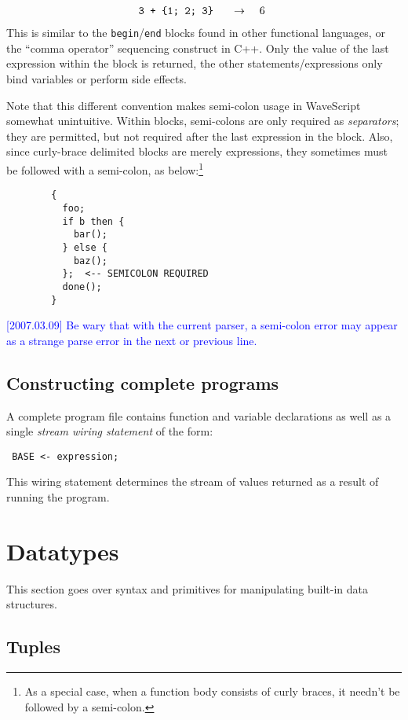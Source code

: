\documentclass[twocolumn]{report}
\newcommand{\rednote}[1]{{\textcolor{blue}{#1}}}
\newcommand{\evalsto}[2]{\[ \begin{array}{rcl}
$\tt #1 $&$ \arr $&$ #2 $
\end{array} \]}
\newcommand{\arr}{\ensuremath{\rightarrow}}
\newenvironment{wscode}{\begin{center}\tt}{\end{center}}
\begin{document}
\evalsto{3 + \{1; 2; 3\}} {6}
%
This is similar to the {\tt begin}/{\tt end} blocks found in other
functional languages, or the ``comma operator'' sequencing construct
in C++.  Only the value of the last expression within the block is
returned, the other statements/expressions only bind variables or
perform side effects.

Note that this different convention makes semi-colon usage in
WaveScript somewhat unintuitive.  Within blocks, semi-colons are only
required as {\em separators}; they are permitted, but not required
after the last expression in the block.  Also, since curly-brace
delimited blocks are merely expressions, they sometimes must be
followed with a semi-colon, as below:\footnote{As a special case, when
a function body consists of curly braces, it needn't be followed by a semi-colon.}

\begin{verbatim}
        {
          foo;
          if b then {
            bar();
          } else {
            baz();
          };  <-- SEMICOLON REQUIRED
          done();
        }
\end{verbatim}

\rednote{[2007.03.09] Be wary that with the current parser, a
  semi-colon error may appear as a strange parse error in the next
  or previous line.}

\subsection{Constructing complete programs}

A complete program file contains function and variable
declarations as well as a single {\em stream wiring statement} of the form:
\begin{wscode}
BASE <- expression;
\end{wscode}
This wiring statement determines the stream of values returned as
a result of running the program.



\section{Datatypes}

This section goes over syntax and primitives for manipulating
built-in data structures.

\subsection{Tuples}
\end{document}
